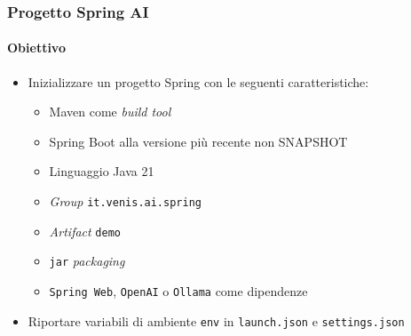 \begin{frame}[t,fragile] \frametitle{Progetto Spring AI}
    \framesubtitle{Obiettivo}
    \begin{itemize}[leftmargin=10pt,align=right]
        \item[\alert{\faArrowCircleRight}] Inizializzare un progetto Spring con le seguenti caratteristiche:     
        \begin{itemize}[leftmargin=10pt,align=right]
            \item[\alert{\faArrowCircleRight}] \alert{Maven} come \textit{build tool}
            \item[\alert{\faArrowCircleRight}] Spring Boot alla versione più recente \alert{non SNAPSHOT}
            \item[\alert{\faArrowCircleRight}] Linguaggio \alert{Java 21}
            \item[\alert{\faArrowCircleRight}] \textit{Group} \alert{\texttt{it.venis.ai.spring}}
            \item[\alert{\faArrowCircleRight}] \textit{Artifact} \alert{\texttt{demo}}
            \item[\alert{\faArrowCircleRight}] \alert{\texttt{jar}} \textit{packaging}
            \item[\alert{\faArrowCircleRight}] \alert{\texttt{Spring Web}}, \alert{\texttt{OpenAI}} o \alert{\texttt{Ollama}} come dipendenze
        \end{itemize}
    \item[\alert{\faExclamationTriangle}] Riportare variabili di ambiente \texttt{env} in \texttt{launch.json} e \texttt{settings.json}
    \end{itemize}
\end{frame}
%
